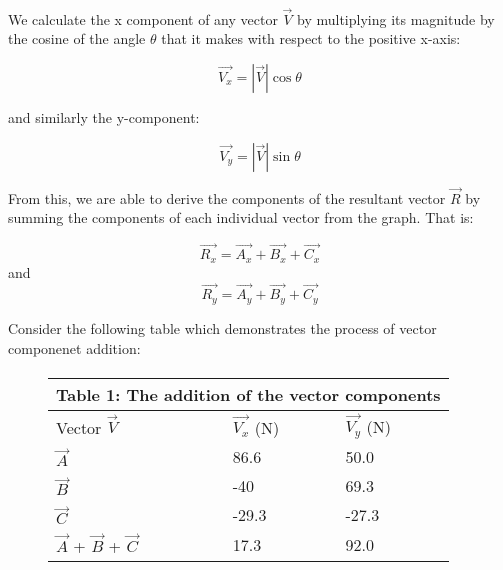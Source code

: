 \documentclass[12pt]{article}
\begin{document}
\paragraph{}

We calculate the x component of any vector $\vec{V}$ by multiplying its magnitude by the cosine of the angle $\theta$ that it makes with respect to the positive x-axis:

\[ \vec{V_x}= |\vec{V}|\cos{\theta}\]

and similarly the y-component:

\[\vec{V_y}= |\vec{V}|\sin{\theta}\]

From this, we are able to derive the components of the resultant vector $\vec{R}$ by summing the components of each individual vector from the graph. That is:

\[\vec{R_x}= \vec{A_x} + \vec{B_x} + \vec{C_x} \]
and
\[\vec{R_y}= \vec{A_y} + \vec{B_y} + \vec{C_y}\]

Consider the following table which demonstrates the process of vector componenet addition:

\paragraph{}

\setlength{\tabcolsep}{18pt}
\renewcommand{\arraystretch}{1.5}

\begin{figure}[H]
    \centering
    \begin{tabular}{ |p{3cm}|p{3cm}|p{3cm}| }
        \hline
        \multicolumn{3}{|c|}{Table 1: The addition of the vector components}  \\
        \hline
        Vector $\vec{V}$                  & $\vec{V_x}$ (N) & $\vec{V_y}$ (N) \\
        \hline
        $\vec{A}$                         & 86.6            & 50.0            \\
        $\vec{B}$                         & -40             & 69.3            \\
        $\vec{C}$                         & -29.3           & -27.3           \\
        \hline
        $\vec{A}$ + $\vec{B}$ + $\vec{C}$ & 17.3            & 92.0            \\
        \hline
    \end{tabular}
\end{figure}

\paragraph{}
\end{document}
